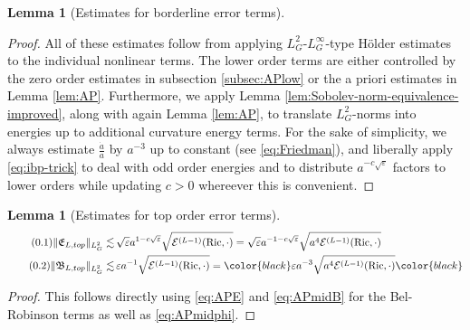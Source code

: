 \documentclass[11pt,leqno,textwidth=10cm]{amsart}
\numberwithin{equation}{section}
\theoremstyle{definition}
\theoremstyle{plain}
\newtheorem{lemma}[definition]{Lemma}
\newcommand{\1}{\mathbbm{1}}
\newcommand{\E}{\mathcal{E}}
\newcommand{\Ric}{\text{\normalfont{Ric}}}
\renewcommand{\epsilon}{\varepsilon}
\newcommand{\Lap}{\Delta}
\newcommand{\numberthis}{\addtocounter{equation}{1}\tag{\theequation}}
\renewcommand{\theequation}{\arabic{section}.\arabic{equation}}
\newcommand{\todo}[1]{\textcolor{red}{#1}}
\newcommand{\change}[1]{\color{black}#1\color{black}}
\begin{document}
\begin{lemma}[Estimates for borderline error terms]
\begin{subequations}
\end{subequations}
\end{lemma}
\begin{proof}
All of these estimates follow from applying $L^2_G$-$L^\infty_G$-type Hölder estimates to the individual nonlinear terms. The lower order terms are either controlled by the zero order estimates in subsection \ref{subsec:APlow} or the a priori estimates in Lemma \ref{lem:AP}. Furthermore, we apply Lemma \ref{lem:Sobolev-norm-equivalence-improved}, along with again Lemma \ref{lem:AP}, to translate $L^2_G$-norms into energies up to additional curvature energy terms. For the sake of simplicity, we always estimate $\frac{\dot{a}}a$ by $a^{-3}$ up to constant (see \eqref{eq:Friedman}), and liberally apply \eqref{eq:ibp-trick} to deal with odd order energies and to distribute $a^{-c\sqrt{\epsilon}}$ factors to lower orders while updating $c>0$ whereever this is convenient.
\end{proof}

\begin{lemma}[Estimates for top order error terms]
\begin{subequations}
\begin{align*}
\numberthis\label{eq:L2-top-E}\|\mathfrak{E}_{L,top}\|_{L^2_G}\lesssim&\,\sqrt{\epsilon} a^{1-c\sqrt{\epsilon}}\sqrt{\E^{(L-1)}(\Ric,\cdot)}=\sqrt{\epsilon}a^{-1-c\sqrt{\epsilon}}\sqrt{a^4\E^{(L-1)}(\Ric,\cdot)}\\
\numberthis\label{eq:L2-top-B}\|\mathfrak{B}_{L,top}\|_{L^2_G}\lesssim&\,\epsilon a^{-1}\sqrt{\E^{(L-1)}(\Ric,\cdot)}=\change{\epsilon a^{-3}\sqrt{a^4\E^{(L-1)}(\Ric,\cdot)}}
\end{align*}
\end{subequations}
\end{lemma}
\begin{proof}
This follows directly using \eqref{eq:APE} and \eqref{eq:APmidB} for the Bel-Robinson terms as well as \eqref{eq:APmidphi}.
\end{proof}
\end{document}
